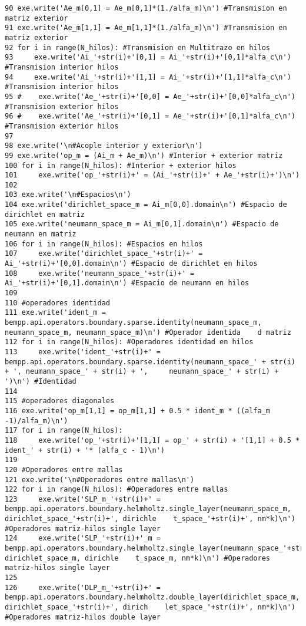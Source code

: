 \documentclass[12pt,letterpaper]{report}
\numberwithin{equation}{section}
\begin{document}
\begin{lstlisting}
90 exe.write('Ae_m[0,1] = Ae_m[0,1]*(1./alfa_m)\n') #Transmision en matriz exterior
91 exe.write('Ae_m[1,1] = Ae_m[1,1]*(1./alfa_m)\n') #Transmision en matriz exterior
92 for i in range(N_hilos): #Transmision en Multitrazo en hilos
93     exe.write('Ai_'+str(i)+'[0,1] = Ai_'+str(i)+'[0,1]*alfa_c\n') #Transmision interior hilos
94     exe.write('Ai_'+str(i)+'[1,1] = Ai_'+str(i)+'[1,1]*alfa_c\n') #Transmision interior hilos
95 #    exe.write('Ae_'+str(i)+'[0,0] = Ae_'+str(i)+'[0,0]*alfa_c\n') #Transmision exterior hilos
96 #    exe.write('Ae_'+str(i)+'[0,1] = Ae_'+str(i)+'[0,1]*alfa_c\n') #Transmision exterior hilos
97 
98 exe.write('\n#Acople interior y exterior\n')
99 exe.write('op_m = (Ai_m + Ae_m)\n') #Interior + exterior matriz
100 for i in range(N_hilos): #Interior + exterior hilos
101     exe.write('op_'+str(i)+' = (Ai_'+str(i)+' + Ae_'+str(i)+')\n')
102 
103 exe.write('\n#Espacios\n')
104 exe.write('dirichlet_space_m = Ai_m[0,0].domain\n') #Espacio de dirichlet en matriz
105 exe.write('neumann_space_m = Ai_m[0,1].domain\n') #Espacio de neumann en matriz
106 for i in range(N_hilos): #Espacios en hilos
107     exe.write('dirichlet_space_'+str(i)+' = Ai_'+str(i)+'[0,0].domain\n') #Espacio de dirichlet en hilos
108     exe.write('neumann_space_'+str(i)+' = Ai_'+str(i)+'[0,1].domain\n') #Espacio de neumann en hilos
109 
110 #operadores identidad
111 exe.write('ident_m = bempp.api.operators.boundary.sparse.identity(neumann_space_m, neumann_space_m, neumann_space_m)\n') #Operador identida    d matriz
112 for i in range(N_hilos): #Operadores identidad en hilos
113     exe.write('ident_'+str(i)+' = bempp.api.operators.boundary.sparse.identity(neumann_space_' + str(i) + ', neumann_space_' + str(i) + ',     neumann_space_' + str(i) + ')\n') #Identidad
114 
115 #operadores diagonales
116 exe.write('op_m[1,1] = op_m[1,1] + 0.5 * ident_m * ((alfa_m -1)/alfa_m)\n')
117 for i in range(N_hilos):
118     exe.write('op_'+str(i)+'[1,1] = op_' + str(i) + '[1,1] + 0.5 * ident_' + str(i) + '* (alfa_c - 1)\n')
119 
120 #Operadores entre mallas
121 exe.write('\n#Operadores entre mallas\n')
122 for i in range(N_hilos): #Operadores entre mallas 
123     exe.write('SLP_m_'+str(i)+' = bempp.api.operators.boundary.helmholtz.single_layer(neumann_space_m, dirichlet_space_'+str(i)+', dirichle    t_space_'+str(i)+', nm*k)\n') #Operadores matriz-hilos single layer
124     exe.write('SLP_'+str(i)+'_m = bempp.api.operators.boundary.helmholtz.single_layer(neumann_space_'+str(i)+', dirichlet_space_m, dirichle    t_space_m, nm*k)\n') #Operadores matriz-hilos single layer
125 
126     exe.write('DLP_m_'+str(i)+' = bempp.api.operators.boundary.helmholtz.double_layer(dirichlet_space_m, dirichlet_space_'+str(i)+', dirich    let_space_'+str(i)+', nm*k)\n') #Operadores matriz-hilos double layer

\end{lstlisting}
\end{document}

